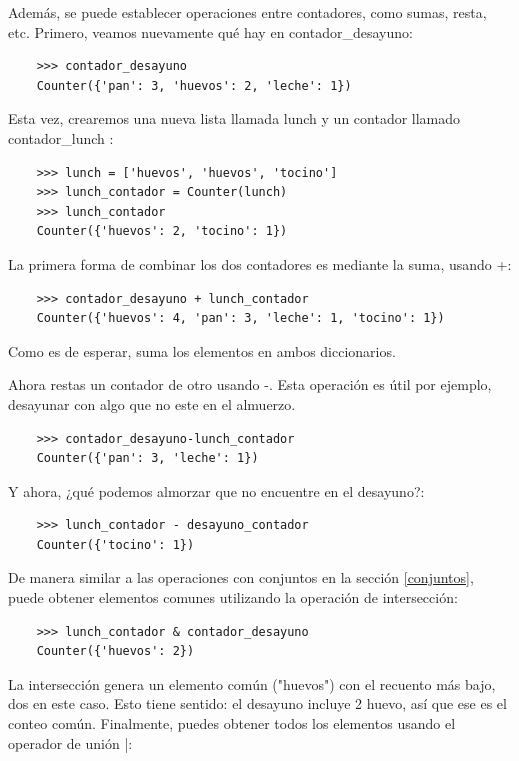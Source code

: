 Además, se puede establecer operaciones entre contadores, como sumas, resta, etc. Primero, veamos nuevamente qué hay en {\ttfamily contador\_desayuno}:

\begin{lstlisting}
	>>> contador_desayuno
	Counter({'pan': 3, 'huevos': 2, 'leche': 1})
\end{lstlisting}

Esta vez, crearemos una nueva lista llamada {\ttfamily lunch} y un contador llamado {\ttfamily contador\_lunch }:

\begin{lstlisting}
	>>> lunch = ['huevos', 'huevos', 'tocino']
	>>> lunch_contador = Counter(lunch)
	>>> lunch_contador
	Counter({'huevos': 2, 'tocino': 1})
\end{lstlisting}


La primera forma de combinar los dos contadores es mediante la suma, usando {\ttfamily +}:

\begin{lstlisting}
	>>> contador_desayuno + lunch_contador 
	Counter({'huevos': 4, 'pan': 3, 'leche': 1, 'tocino': 1})
\end{lstlisting}

Como es de esperar, suma los elementos en ambos diccionarios. 

Ahora restas un contador de otro usando {\ttfamily -}. 
Esta operación es útil por ejemplo,  desayunar con algo que no este en el almuerzo.

\begin{lstlisting}
	>>> contador_desayuno-lunch_contador
	Counter({'pan': 3, 'leche': 1})
\end{lstlisting}

Y ahora, ¿qué podemos almorzar que no encuentre en el desayuno?:

\begin{lstlisting}
	>>> lunch_contador - desayuno_contador
	Counter({'tocino': 1})
\end{lstlisting}

De manera similar a las operaciones con conjuntos en la sección  \ref{conjuntos}, puede obtener 
elementos comunes utilizando la operación de intersección:

\begin{lstlisting}	
	>>> lunch_contador & contador_desayuno
	Counter({'huevos': 2})
\end{lstlisting}

La intersección genera un elemento común ("huevos") con el recuento más bajo, dos en este caso. Esto tiene
sentido: el desayuno  incluye 2 huevo, así que ese es el conteo común.
Finalmente, puedes obtener todos los elementos usando el operador de unión {\ttfamily |}:

